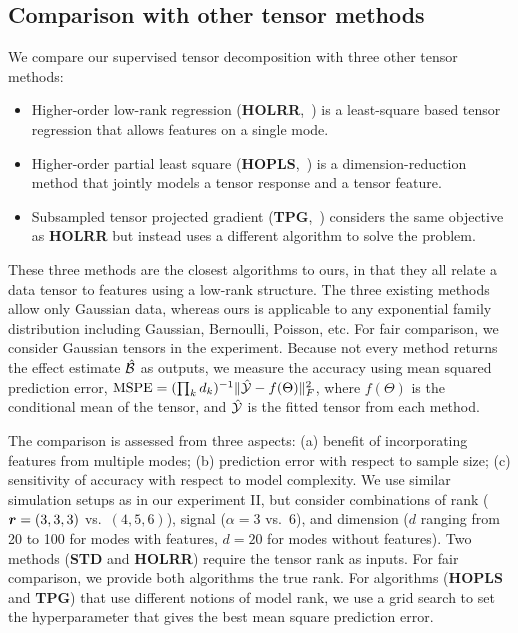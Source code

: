 \documentclass[12pt]{article}
\theoremstyle{definition}
\theoremstyle{definition}
\begin{document}
\subsection{Comparison with other tensor methods}
We compare our supervised tensor decomposition with three other tensor methods:
\begin{itemize}
\item  Higher-order low-rank regression ({\bf HOLRR},~\citet{rabusseau2016low}) is a least-square based tensor regression that allows features on a single mode. 
\item Higher-order partial least square ({\bf HOPLS},~\citet{zhao2012higher}) is a dimension-reduction method that jointly models a tensor response and a tensor feature. 
\item Subsampled tensor projected gradient ({\bf TPG},~\citet{yu2016learning}) considers the same objective as {\bf HOLRR} but instead uses a different algorithm to solve the problem. 
\end{itemize}
These three methods are the closest algorithms to ours, in that they all relate a data tensor to features using a low-rank structure. The three existing methods allow only Gaussian data, whereas ours is applicable to any exponential family distribution including Gaussian, Bernoulli, Poisson, etc. For fair comparison, we consider Gaussian tensors in the experiment. Because not every method returns the effect estimate $\hat {\mathcal{B}}$ as outputs, we measure the accuracy using mean squared prediction error, $\text{MSPE}=(\prod_kd_k)^{-1}\lVert\hat {\mathcal{Y}}-f(\Theta)\rVert_F^2$, where $f(\Theta)$ is the conditional mean of the tensor, and $\hat {\mathcal{Y}}$ is the fitted tensor from each method. 

The comparison is assessed from three aspects: (a) benefit of incorporating features from multiple modes; (b) prediction error with respect to sample size; (c) sensitivity of accuracy with respect to model complexity. We use similar simulation setups as in our experiment II, but consider combinations of rank ($\bm{r}=(3,3,3)$ vs.\ $(4,5,6)$), signal ($\alpha = 3$ vs.\ $6$), and dimension ($d$ ranging from 20 to 100 for modes with features, $d = 20$ for modes without features). Two methods ({\bf STD} and {\bf HOLRR}) require the tensor rank as inputs. For fair comparison, we provide both algorithms the true rank. For algorithms ({\bf HOPLS} and {\bf TPG}) that use different notions of model rank, we use a grid search to set the hyperparameter that gives the best mean square prediction error.
\end{document}
